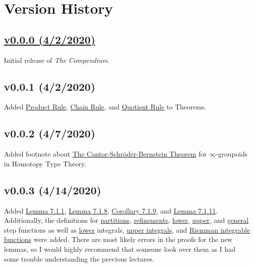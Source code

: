 \documentclass[11pt]{book}
\newcounter{lemma}
\newcounter{definition}
\begin{document}
\section{Version History}
	\subsection{\href{https://www.overleaf.com/read/gyqrjdfnjyvb}{v0.0.0 (4/2/2020)}}
		Initial release of \emph{The Compendium}. 		
	\subsection{v0.0.1 (4/2/2020)}
		Added \hyperref[subsec:productrule]{Product Rule}, \hyperref[subsec:chainrule]{Chain Rule}, and \hyperref[subsec:quotientrule]{Quotient Rule} to Theorems.
	\subsection{v0.0.2 (4/7/2020)}
		Added footnote about \hyperref[subsec:CBST]{The Cantor-Schr{\"o}der-Bernstein Theorem} for $\infty$-groupoids in Homotopy Type Theory.
	\subsection{v0.0.3 (4/14/2020)}
		Added \hyperref[subsec:lemm711]{Lemma 7.1.1}, \hyperref[subsec:lemm718]{Lemma 7.1.8}, \hyperref[subsec:cor719]{Corollary 7.1.9}, and \hyperref[subsec:lemm7111]{Lemma 7.1.11}.
		Additionally, the definitions for \hyperref[subsec:partition]{partitions}, \hyperref[subsec:refinement]{refinements}, \hyperref[subsec:lowerstepfunction]{lower}, 
		\hyperref[subsec:upperstepfunction]{upper}, and \hyperref[subsec:stepfuction]{general} step functions as well as \hyperref[subsec:lowerintegral]{lower} integrals, 
		\hyperref[subsec:upperintegral]{upper integrals}, and \hyperref[subsec:riemannintegrable]{Riemman integrable functions} were added. There are most likely errors in the proofs for the
		new lemmas, so I would highly recommend that someone look over them as I had some trouble understanding the previous lectures.
\end{document}
